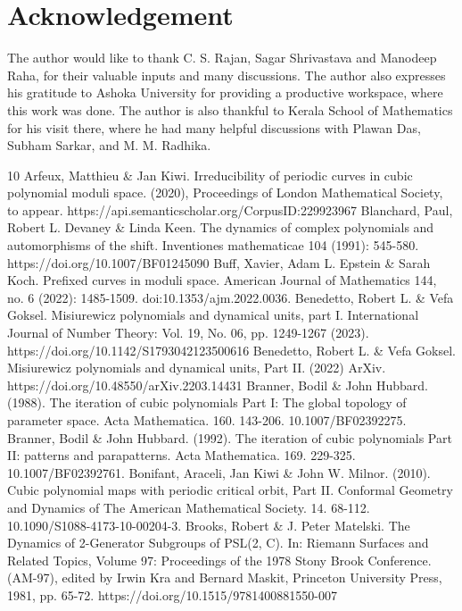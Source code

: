 \documentclass[reqno]{amsart}
\numberwithin{equation}{section}
\theoremstyle{plain}
\theoremstyle{definition}
\theoremstyle{definition}
\begin{document}
\section*{Acknowledgement}
    The author would like to thank C. S. Rajan, Sagar Shrivastava and Manodeep Raha, for their valuable inputs and many discussions. The author also expresses his gratitude to Ashoka University for providing a productive workspace, where this work was done. The author is also thankful to Kerala School of Mathematics for his visit there, where he had many helpful discussions with Plawan Das, Subham Sarkar, and M. M. Radhika. 
\begin{thebibliography}{10}
        Arfeux, Matthieu \& Jan Kiwi.  Irreducibility of periodic curves in cubic polynomial moduli space. (2020), Proceedings of London Mathematical Society, to appear. https://api.semanticscholar.org/CorpusID:229923967
        Blanchard, Paul, Robert L. Devaney \& Linda Keen.  The dynamics of complex polynomials and automorphisms of the shift. Inventiones mathematicae 104 (1991): 545-580. https://doi.org/10.1007/BF01245090
        Buff, Xavier, Adam L. Epstein \& Sarah Koch.  Prefixed curves in moduli space. American Journal of Mathematics 144, no. 6 (2022): 1485-1509. doi:10.1353/ajm.2022.0036.
        Benedetto, Robert L. \& Vefa Goksel.  Misiurewicz polynomials and dynamical units, part I. International Journal of Number Theory: Vol. 19, No. 06, pp. 1249-1267 (2023). https://doi.org/10.1142/S1793042123500616
        Benedetto, Robert L. \& Vefa Goksel. Misiurewicz polynomials and dynamical units, Part II. (2022) ArXiv. https://doi.org/10.48550/arXiv.2203.14431
        Branner, Bodil \& John Hubbard. (1988). The iteration of cubic polynomials Part I: The global topology of parameter space. Acta Mathematica. 160. 143-206. 10.1007/BF02392275. 
        Branner, Bodil \& John Hubbard. (1992). The iteration of cubic polynomials Part II: patterns and parapatterns. Acta Mathematica. 169. 229-325. 10.1007/BF02392761. 
        Bonifant, Araceli, Jan Kiwi \& John W. Milnor. (2010). Cubic polynomial maps with periodic critical orbit, Part II. Conformal Geometry and Dynamics of The American Mathematical Society. 14. 68-112. 10.1090/S1088-4173-10-00204-3. 
        Brooks, Robert \& J. Peter Matelski. The Dynamics of 2-Generator Subgroups of PSL(2, C). In: Riemann Surfaces and Related Topics, Volume 97: Proceedings of the 1978 Stony Brook Conference. (AM-97), edited by Irwin Kra and Bernard Maskit, Princeton University Press, 1981, pp. 65-72. https://doi.org/10.1515/9781400881550-007

\end{thebibliography}
\end{document}
